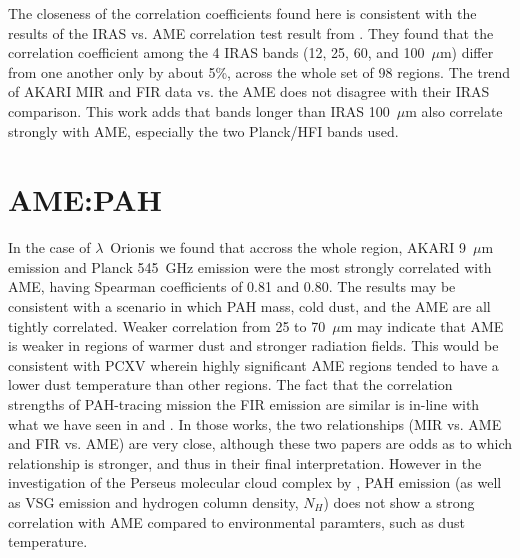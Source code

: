 
        The closeness of the correlation coefficients found here is consistent with the results of the IRAS vs. AME correlation test result from \cite{planckXV}. They found that the correlation coefficient among the 4 IRAS bands (12, 25, 60, and 100~$\mu$m) differ from one another only by about 5\%, across the whole set of 98 regions. The trend of AKARI MIR and FIR data vs. the AME does not disagree with their IRAS comparison. This work adds that bands longer than IRAS 100~$\mu$m also correlate strongly with AME, especially the two Planck/HFI bands used.

      \section{AME:PAH}

        In the case of $\lambda$~Orionis we found that accross the whole region, AKARI 9~$\mu$m emission and Planck 545~GHz emission were the most strongly correlated with AME, having Spearman coefficients of 0.81 and 0.80. The results may be consistent with a scenario in which PAH mass, cold dust, and the AME are all tightly correlated. Weaker correlation from 25 to 70~$\mu$m may indicate that AME is weaker in regions of warmer dust and stronger radiation fields. This would be consistent with PCXV wherein highly significant AME regions tended to have a lower dust temperature than other regions. The fact that the correlation strengths of PAH-tracing mission the FIR emission are similar is in-line with what we have seen in \cite{ysard10b} and \cite{hensley16}. In those works, the two relationships (MIR vs. AME and FIR vs. AME) are very close, although these two papers are odds as to which relationship is stronger, and thus in their final interpretation. However in the investigation of the Perseus molecular cloud complex by \cite{tibbs11}, PAH emission (as well as VSG emission and hydrogen column density, $N_{H}$) does not show a strong correlation with AME compared to environmental paramters, such as dust temperature.

